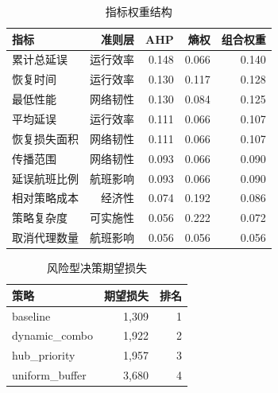 \documentclass[UTF8,zihao=-4]{ctexart}
\begin{document}
\begin{table}[H]\centering\caption{指标权重结构}
\begin{tabular}{lrrrr}
\toprule
指标 & 准则层 & AHP & 熵权 & 组合权重 \\
\midrule
累计总延误 & 运行效率 & 0.148 & 0.066 & 0.140 \\
恢复时间 & 运行效率 & 0.130 & 0.117 & 0.128 \\
最低性能 & 网络韧性 & 0.130 & 0.084 & 0.125 \\
平均延误 & 运行效率 & 0.111 & 0.066 & 0.107 \\
恢复损失面积 & 网络韧性 & 0.111 & 0.066 & 0.107 \\
传播范围 & 网络韧性 & 0.093 & 0.066 & 0.090 \\
延误航班比例 & 航班影响 & 0.093 & 0.066 & 0.090 \\
相对策略成本 & 经济性 & 0.074 & 0.192 & 0.086 \\
策略复杂度 & 可实施性 & 0.056 & 0.222 & 0.072 \\
取消代理数量 & 航班影响 & 0.056 & 0.056 & 0.056 \\
\bottomrule
\end{tabular}
\end{table}

\begin{table}[H]\centering\caption{风险型决策期望损失}
\begin{tabular}{lrr}
\toprule
策略 & 期望损失 & 排名 \\
\midrule
baseline & 1,309 & 1 \\
dynamic\_combo & 1,922 & 2 \\
hub\_priority & 1,957 & 3 \\
uniform\_buffer & 3,680 & 4 \\
\bottomrule
\end{tabular}
\end{table}
\end{document}
